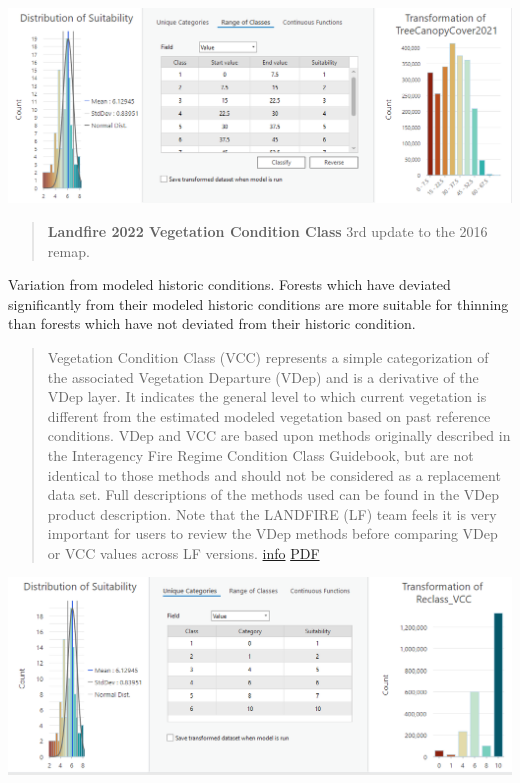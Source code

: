 \documentclass[
]{agujournal2019}
\begin{document}
\includegraphics{images/CanopyCover_suitability.PNG}

\begin{quote}
\textbf{Landfire 2022 Vegetation Condition Class} 3rd update to the 2016
remap.
\end{quote}

Variation from modeled historic conditions. Forests which have deviated
significantly from their modeled historic conditions are more suitable
for thinning than forests which have not deviated from their historic
condition.

\begin{quote}
Vegetation Condition Class (VCC) represents a simple categorization of
the associated Vegetation Departure (VDep) and is a derivative of the
VDep layer. It indicates the general level to which current vegetation
is different from the estimated modeled vegetation based on past
reference conditions. VDep and VCC are based upon methods originally
described in the Interagency Fire Regime Condition Class Guidebook, but
are not identical to those methods and should not be considered as a
replacement data set. Full descriptions of the methods used can be found
in the VDep product description. Note that the LANDFIRE (LF) team feels
it is very important for users to review the VDep methods before
comparing VDep or VCC values across LF versions.
\href{https://www.landfire.gov/vegetation/vcc}{info}
\href{chrome-extension://efaidnbmnnnibpcajpcglclefindmkaj/https://www.landfire.gov/sites/default/files/DataDictionary/LF2022/LF22_VCCADD_230.pdf}{PDF}
\end{quote}

\includegraphics{images/VCC_suitability.PNG}
\end{document}
